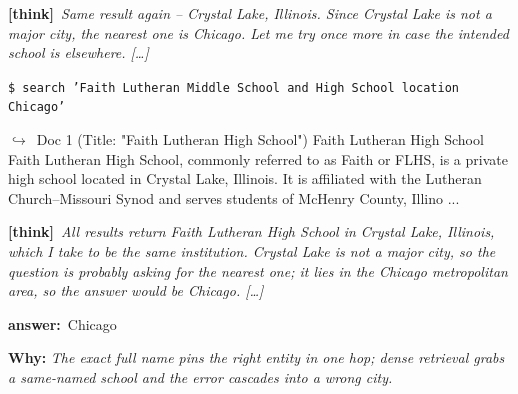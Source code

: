\documentclass{llmxive}
\providecommand{\winbadge}{\colorbox{green!50!black}{\scriptsize\bfseries\,WIN\,}}
\providecommand{\thk}[1]{{\footnotesize\textbf{[think]}\ \textit{#1}\par}}
\providecommand{\cmd}[1]{{\footnotesize\texttt{\$\ #1}\par}}
\providecommand{\retr}[1]{{\footnotesize\quad$\hookrightarrow$\ #1\par}}
\providecommand{\ans}[1]{{\footnotesize\textbf{answer:}\ #1\par}}
\begin{document}
\begin{cmpbox}[label={ex:hotpot-faithlutheran},title={\winbadge\ \ \textsc{HotpotQA -- name-collision disambiguation}}]
  \thk{Same result again -- Crystal Lake, Illinois. Since Crystal Lake is not a major city, the nearest one is Chicago. Let me try once more in case the intended school is elsewhere. […]}
  \cmd{search 'Faith Lutheran Middle School and High School location Chicago'}
  \retr{Doc 1 (Title: "Faith Lutheran High School") Faith Lutheran High School Faith Lutheran High School, commonly referred to as Faith or FLHS, is a private high school located in Crystal Lake, Illinois. It is affiliated with the Lutheran Church–Missouri Synod and serves students of McHenry County, Illino ...}
  \thk{All results return Faith Lutheran High School in Crystal Lake, Illinois, which I take to be the same institution. Crystal Lake is not a major city, so the question is probably asking for the nearest one; it lies in the Chicago metropolitan area, so the answer would be Chicago. […]}
  \ans{Chicago}
\smallskip\par\textbf{Why:} \textit{The exact full name pins the right entity in one hop; dense retrieval grabs a same-named school and the error cascades into a wrong city.}
\end{cmpbox}\bigskip
\end{document}
